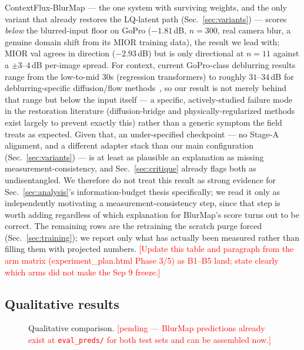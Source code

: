 \documentclass{article}
\newcommand{\authnote}[1]{\textcolor{red}{\footnotesize [#1]}}
\begin{document}
ContextFlux-BlurMap — the one system with surviving weights, and the only variant that already restores the LQ-latent path (Sec.~\ref{sec:variants}) — scores \emph{below} the blurred-input floor on GoPro ($-1.81$\,dB, $n{=}300$, real camera blur, a genuine domain shift from its MIOR training data), the result we lead with; MIOR val agrees in direction ($-2.93$\,dB) but is only directional at $n{=}11$ against a $\pm 3$--$4$\,dB per-image spread. For context, current GoPro-class deblurring results range from the low-to-mid $30$s (regression transformers) to roughly $31$--$34$\,dB for deblurring-specific diffusion/flow methods~\cite{deblurflow2026}, so our result is not merely behind that range but below the input itself — a specific, actively-studied failure mode in the restoration literature (diffusion-bridge and physically-regularized methods exist largely to prevent exactly this) rather than a generic symptom the field treats as expected. Given that, an under-specified checkpoint — no Stage-A alignment, and a different adapter stack than our main configuration (Sec.~\ref{sec:variants}) — is at least as plausible an explanation as missing measurement-consistency, and Sec.~\ref{sec:critique} already flags both as undisentangled. We therefore do not treat this result as strong evidence for Sec.~\ref{sec:analysis}'s information-budget thesis specifically; we read it only as independently motivating a measurement-consistency step, since that step is worth adding regardless of which explanation for BlurMap's score turns out to be correct. The remaining rows are the retraining the scratch purge forced (Sec.~\ref{sec:training}); we report only what has actually been measured rather than filling them with projected numbers. \authnote{Update this table and paragraph from the arm matrix (experiment\_plan.html Phase 3/5) as B1--B5 land; state clearly which arms did not make the Sep 9 freeze.}

\subsection{Qualitative results}
\begin{figure}[t]
\centering
\fbox{\parbox[c][2.6cm][c]{0.94\linewidth}{\centering \authnote{Qualitative grid: input / NAFNet / LoRA-control / ContextFlux-BlurMap / ContextFlux-V-JEPA (if it lands) / GT, on GoPro, from the eval\_preds dumps already on disk for BlurMap.}}}
\caption{Qualitative comparison. \authnote{pending — BlurMap predictions already exist at \texttt{eval\_preds/} for both test sets and can be assembled now.}}
\label{fig:qual}
\end{figure}
\end{document}
